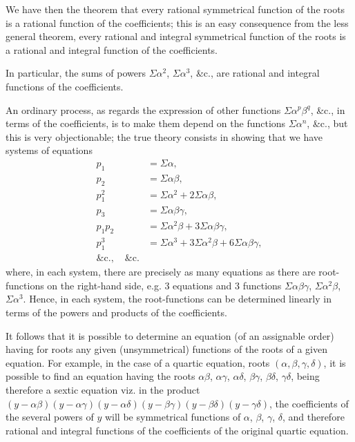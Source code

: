 \documentclass[11pt,a4paper]{book}
\begin{document}
We have then the theorem that every rational symmetrical function of the roots is a rational function of the coefficients; this is an easy consequence from the less general theorem, every rational and integral symmetrical function of the roots is a rational and integral function of the coefficients.

In particular, the sums of powers $\Sigma\alpha^2$, $\Sigma\alpha^3$, \&c., are rational and integral functions of the coefficients.

An ordinary process, as regards the expression of other functions $\Sigma\alpha^p \beta^q$, \&c., in terms of the coefficients, is to make them depend on the functions $\Sigma\alpha^n$, \&c., but this is very objectionable; the true theory consists in showing that we have systems of equations
\begin{align*}
p_1 &= \Sigma\alpha, \\
p_2 &= \Sigma\alpha\beta, \\
p_1^2 &= \Sigma\alpha^2 + 2\Sigma\alpha\beta, \\
p_3 &= \Sigma\alpha\beta\gamma, \\
p_1 p_2 &= \Sigma\alpha^2\beta + 3\Sigma\alpha\beta\gamma, \\
p_1^3 &= \Sigma\alpha^3 + 3\Sigma\alpha^2\beta + 6\Sigma\alpha\beta\gamma, \\
\&\text{c.}, \quad \&\text{c.}
\end{align*}
where, in each system, there are precisely as many equations as there are root-functions on the right-hand side, e.g. 3 equations and 3 functions $\Sigma\alpha\beta\gamma$, $\Sigma\alpha^2\beta$, $\Sigma\alpha^3$. Hence, in each system, the root-functions can be determined linearly in terms of the powers and products of the coefficients.

\clearpage
\setcounter{page}{8}

It follows that it is possible to determine an equation (of an assignable order) having for roots any given (unsymmetrical) functions of the roots of a given equation. For example, in the case of a quartic equation, roots $(\alpha, \beta, \gamma, \delta)$, it is possible to find an equation having the roots $\alpha\beta$, $\alpha\gamma$, $\alpha\delta$, $\beta\gamma$, $\beta\delta$, $\gamma\delta$, being therefore a sextic equation viz. in the product $(y - \alpha\beta)(y - \alpha\gamma)(y - \alpha\delta)(y - \beta\gamma)(y - \beta\delta)(y - \gamma\delta)$, the coefficients of the several powers of $y$ will be symmetrical functions of $\alpha$, $\beta$, $\gamma$, $\delta$, and therefore rational and integral functions of the coefficients of the original quartic equation.
\end{document}
